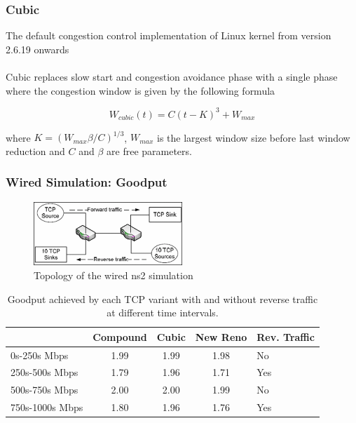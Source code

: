 \documentclass{beamer}
\begin{document}
\begin{frame}
\frametitle{Cubic}
The default congestion control implementation of Linux kernel  from version 2.6.19 onwards\\~\\

Cubic replaces slow start and congestion avoidance phase with a single phase where the congestion window is given by the following formula

\[
W_{cubic}(t) = C(t - K)^3 + W_{max}   
\]

where $K = (W_{max} \beta / C)^{1 / 3}$, $W_{max}$ is the largest window size before last window reduction and $C$ and $\beta$ are free parameters.

\end{frame}

\begin{frame}
\frametitle{Wired Simulation: Goodput}


\begin{figure}
	\includegraphics[width=0.5\textwidth]{images/abdeljaouad10_topology_1.png}
	\caption{Topology of the wired ns2 simulation}
\end{figure}

\begin{table}
\small
\begin{tabular}{l*{3}{c}l}
& Compound & Cubic & New Reno & Rev. Traffic \\
\hline
0s-250s Mbps & 1.99 & 1.99 & 1.98 & No \\
250s-500s Mbps & 1.79 & 1.96 & 1.71 & Yes \\
500s-750s Mbps & 2.00 & 2.00 & 1.99 & No \\
750s-1000s Mbps & 1.80 & 1.96 & 1.76 & Yes \\
\end{tabular}
\caption{Goodput achieved by each TCP variant with and without reverse traffic at different time intervals.}
\end{table}

\end{frame}
\end{document}

